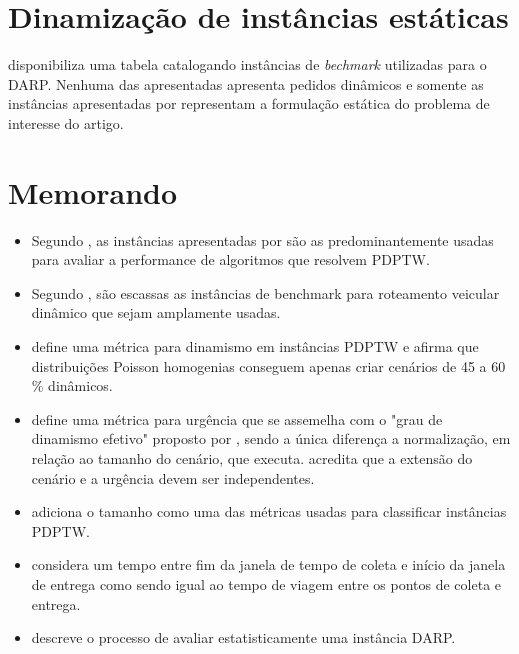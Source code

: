 \documentclass{anpet}
\begin{document}
\section{Dinamização de instâncias estáticas}
\textcite{ho_survey_2018} disponibiliza uma tabela catalogando instâncias de \textit{bechmark} utilizadas para o DARP. Nenhuma das apresentadas apresenta pedidos dinâmicos e somente as instâncias apresentadas por \textcite{cordeau_branch-and-cut_2006, cordeau_tabu_2003, ropke_models_2007} representam a formulação estática do problema de interesse do artigo.

 
\section{Memorando}
\begin{itemize}
    \item Segundo \textcite{parragh_survey_2008-1}, as instâncias apresentadas por \textcite{li_metaheuristic_2003} são as predominantemente usadas para avaliar a performance de algoritmos que resolvem PDPTW.

    \item Segundo \textcite{pillac_review_2013}, são escassas as instâncias de benchmark para roteamento veicular dinâmico que sejam amplamente usadas.

    \item \textcite{van_lon_measures_2016} define uma métrica para dinamismo em instâncias PDPTW e afirma que distribuições Poisson homogenias conseguem apenas criar cenários de 45 a 60 \% dinâmicos. 

   \item \textcite{van_lon_measures_2016} define uma métrica para urgência que se assemelha com o "grau de dinamismo efetivo" proposto por \textcite{larsen_partially_2002}, sendo a única diferença a normalização, em relação ao tamanho do cenário, que \textcite{larsen_partially_2002} executa. \textcite{van_lon_measures_2016} acredita que a extensão do cenário e a urgência devem ser independentes.

   \item \textcite{van_lon_towards_2015} adiciona o tamanho como uma das métricas usadas para classificar instâncias PDPTW.   
   
   \item \textcite{berbeglia_hybrid_2012} considera um tempo entre fim da janela de tempo de coleta e início da janela de entrega como sendo igual ao tempo de viagem entre os pontos de coleta e entrega.
   
   \item \textcite{schilde_metaheuristics_2011} descreve o processo de avaliar estatisticamente uma instância DARP.

\end{itemize}
\end{document}
